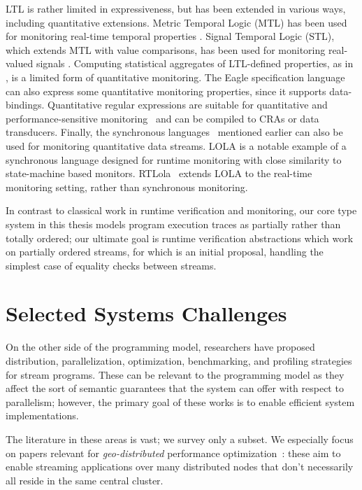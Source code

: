 LTL is rather limited in expressiveness, but has been extended in various ways,
including quantitative extensions.
Metric Temporal Logic (MTL) has been used for monitoring real-time temporal properties \cite{TR2005MTL}. Signal Temporal Logic (STL), which extends MTL with value comparisons, has been used for monitoring real-valued signals \cite{DDGJJS2017}.
Computing statistical aggregates of LTL-defined properties, as in \cite{finkbeiner2002collecting}, is a limited form of quantitative monitoring.
The Eagle specification language \cite{barringer2004rule} can also express some quantitative monitoring properties, since it supports data-bindings.
Quantitative regular expressions are suitable for quantitative and performance-sensitive monitoring~\cite{QRE,StreamQRE,YLMMAL2017NQRE,AAMMR2018}
and can be compiled to CRAs or data transducers.
Finally, the synchronous languages~\cite{BCEHlGdS2003SL} mentioned earlier can also be used for monitoring quantitative data streams.
LOLA \cite{d2005lola,bozzelli2016foundations} is a notable example of a synchronous language designed for runtime monitoring
with close similarity to state-machine based monitors.
RTLola~\cite{faymonville2017real} extends LOLA to the real-time monitoring setting, rather than synchronous monitoring.

In contrast to classical work in runtime verification and monitoring, our core type system in this thesis models program execution traces as partially rather than totally ordered; our ultimate goal is runtime verification abstractions which work on partially ordered streams, for which  is an initial proposal, handling the simplest case of equality checks between streams.

\section{Selected Systems Challenges}

On the other side of the programming model,
researchers have proposed distribution, parallelization, optimization, benchmarking, and profiling strategies for stream programs.
These can be relevant to the programming model as they affect the sort of semantic guarantees that the system can offer with respect to parallelism;
however, the primary goal of these works is to enable efficient system implementations.

The literature in these areas is vast; we survey only a subset. We especially focus on papers relevant for \emph{geo-distributed} performance optimization~: these aim to enable streaming applications over many distributed nodes that don't necessarily all reside in the same central cluster.

